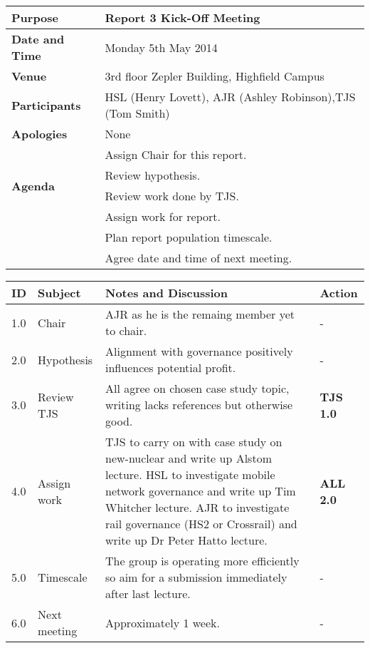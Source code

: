 {}


\begin{center}
\begin{longtable}{| m{} | m{} |} \hline
\textbf{Purpose} & Report 3 Kick-Off Meeting \\ \hline
\textbf{Date and Time} & Monday 5th May 2014 \\ \hline
\textbf{Venue} & 3rd floor Zepler Building, Highfield Campus \\ \hline
\textbf{Participants} & HSL (Henry Lovett), AJR (Ashley Robinson),TJS (Tom Smith)\\ \hline
\textbf{Apologies} &None \\ \hline
\multirow{4}{*}{\textbf{Agenda}} & Assign Chair for this report. \\
  & Review hypothesis. \\
 & Review work done by TJS. \\ 
 & Assign work for report. \\
 & Plan report population timescale. \\
 & Agree date and time of next meeting. \\ \hline
\end{longtable}
\end{center}

\begin{center}
\begin{longtable}{| p{} |>{\raggedright\arraybackslash}p{} | p{} |>{\raggedright\arraybackslash}p{}|} \hline
\textbf{ID} & \textbf{Subject} & \textbf{Notes and Discussion} & \textbf{Action} \\ \hline
\endhead
1.0	&	Chair	&	AJR as he is the remaing member yet to chair. 	&   -	 \\ \hline
2.0 & Hypothesis & Alignment with governance positively influences potential profit. & - \\ \hline
3.0	&	Review TJS & All agree on chosen case study topic, writing lacks references but otherwise good. & \textbf{TJS 1.0} \\ \hline
4.0 & 	Assign work & TJS to carry on with case study on new-nuclear and write up Alstom lecture. HSL to investigate mobile network governance and write up Tim Whitcher lecture. AJR to investigate rail governance (HS2 or Crossrail) and write up Dr Peter Hatto lecture.   &  \textbf{ALL 2.0} \\ \hline
5.0 & Timescale  & The group is operating more efficiently so aim for a submission immediately after last lecture.  & -\\ \hline
6.0 & Next meeting & Approximately 1 week.  & - \\ \hline

\end{longtable}
\end{center}

